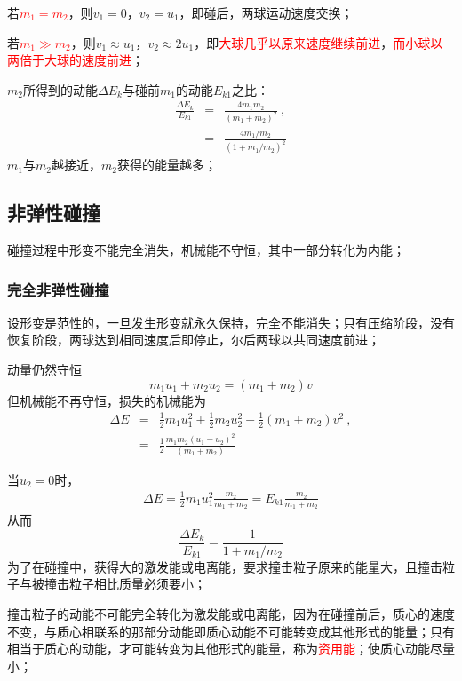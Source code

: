 \documentclass[11pt,a4paper]{article}
\begin{document}
若\textcolor{red}{$m_1 = m_2$}，则$v_1 = 0$，$v_2 = u_1$，即碰后，两球运动速度交换；

若\textcolor{red}{$m_1 \gg m_2$}，则$v_1 \approx u_1$，$v_2 \approx 2u_1$，即\textcolor{red}{大球几乎以原来速度继续前进}，\textcolor{red}{而小球以两倍于大球的速度前进}；

$m_2$所得到的动能$\Delta E_k$与碰前$m_1$的动能$E_{k1}$之比：
\begin{eqnarray}
\nonumber \frac{\Delta E_k}{E_{k1}} &=& \frac{4m_1 m_2}{(m_1 +m_2)^2} ~, \\
&=& \frac{4m_1/m_2}{(1+m_1/m_2)^2}
\end{eqnarray}
$m_1$与$m_2$越接近，$m_2$获得的能量越多；


\subsection{非弹性碰撞}
碰撞过程中形变不能完全消失，机械能不守恒，其中一部分转化为内能；

\subsubsection{完全非弹性碰撞}
设形变是范性的，一旦发生形变就永久保持，完全不能消失；只有压缩阶段，没有恢复阶段，两球达到相同速度后即停止，尔后两球以共同速度前进；

动量仍然守恒
\begin{equation}
m_1 u_1 + m_2 u_2 = (m_1 +m_2) v
\end{equation}
但机械能不再守恒，损失的机械能为
\begin{eqnarray}
\nonumber \Delta E &=& \frac{1}{2} m_1 u_1^2 +\frac{1}{2} m_2 u_2^2 -\frac{1}{2}(m_1 +m_2)v^2 ~,\\
&=& \frac{1}{2} \frac{m_1 m_2(u_1-u_2)^2}{(m_1 +m_2)}
\end{eqnarray}

当$u_2 = 0$时，
\begin{eqnarray}
\Delta E = \frac{1}{2} m_1 u_1^2 \frac{m_2}{m_1 +m_2} = E_{k1} \frac{m_2}{m_1 +m_2}
\end{eqnarray}
从而
\begin{equation}
\frac{\Delta E_k}{E_{k1}} = \frac{1}{1+m_1/m_2}
\end{equation}
为了在碰撞中，获得大的激发能或电离能，要求撞击粒子原来的能量大，且撞击粒子与被撞击粒子相比质量必须要小；

撞击粒子的动能不可能完全转化为激发能或电离能，因为在碰撞前后，质心的速度不变，与质心相联系的那部分动能即质心动能不可能转变成其他形式的能量；只有相当于质心的动能，才可能转变为其他形式的能量，称为\textcolor{red}{资用能}；使质心动能尽量小；
\end{document}
